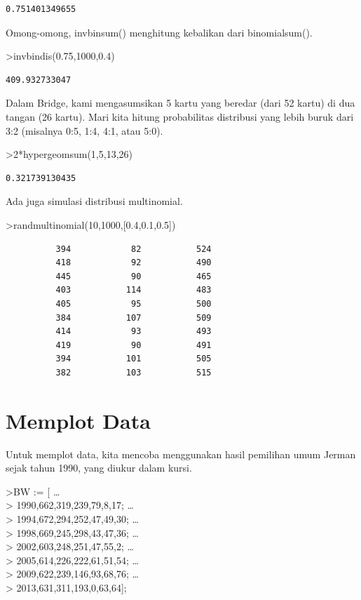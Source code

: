 \documentclass[
]{book}
\begin{document}
\begin{verbatim}
0.751401349655
\end{verbatim}

Omong-omong, invbinsum() menghitung kebalikan dari binomialsum().

\textgreater invbindis(0.75,1000,0.4)

\begin{verbatim}
409.932733047
\end{verbatim}

Dalam Bridge, kami mengasumsikan 5 kartu yang beredar (dari 52 kartu) di dua tangan (26 kartu). Mari kita hitung probabilitas distribusi yang lebih buruk dari 3:2 (misalnya 0:5, 1:4, 4:1, atau 5:0).

\textgreater2*hypergeomsum(1,5,13,26)

\begin{verbatim}
0.321739130435
\end{verbatim}

Ada juga simulasi distribusi multinomial.

\textgreater randmultinomial(10,1000,{[}0.4,0.1,0.5{]})

\begin{verbatim}
          394            82           524 
          418            92           490 
          445            90           465 
          403           114           483 
          405            95           500 
          384           107           509 
          414            93           493 
          419            90           491 
          394           101           505 
          382           103           515 
\end{verbatim}

\chapter{Memplot Data}\label{memplot-data}

Untuk memplot data, kita mencoba menggunakan hasil pemilihan umum Jerman sejak tahun 1990, yang diukur dalam kursi.

\textgreater BW := {[} \ldots{}\\
\textgreater{} 1990,662,319,239,79,8,17; \ldots{}\\
\textgreater{} 1994,672,294,252,47,49,30; \ldots{}\\
\textgreater{} 1998,669,245,298,43,47,36; \ldots{}\\
\textgreater{} 2002,603,248,251,47,55,2; \ldots{}\\
\textgreater{} 2005,614,226,222,61,51,54; \ldots{}\\
\textgreater{} 2009,622,239,146,93,68,76; \ldots{}\\
\textgreater{} 2013,631,311,193,0,63,64{]};
\end{document}
